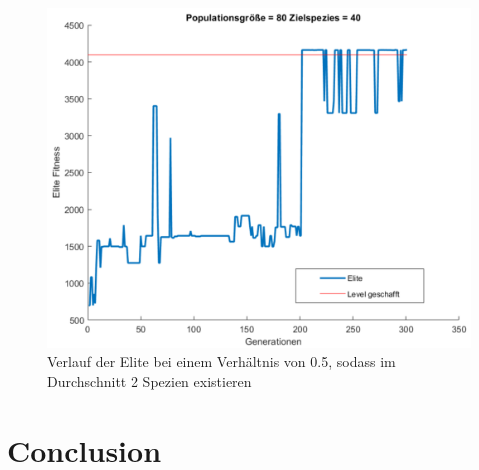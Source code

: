 \documentclass{hbrs-ecta-report}
\begin{document}
\begin{figure}[ht!]
\centering
\includegraphics[width=\linewidth]{img/Mario_80_Netze_target_40.png}
\caption{Verlauf der Elite bei einem Verhältnis von 0.5, sodass im Durchschnitt 2 Spezien existieren}
\label{fig:Verhaeltniss0_5} 
\end{figure}



\FloatBarrier
\newpage
\section{Conclusion}



 
\end{document}
